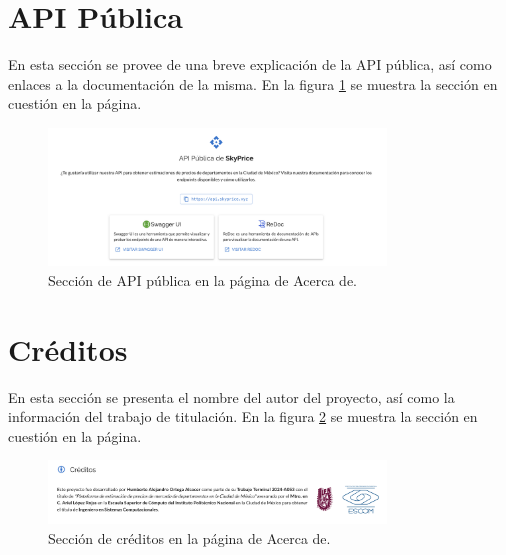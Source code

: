 \section{API Pública}
En esta sección se provee de una breve explicación de la API pública, así como
enlaces a la documentación de la misma. En la figura \ref{fig:api} se muestra la
sección en cuestión en la página.

\begin{figure}[H]
  \centering
  \includegraphics[width=0.8\textwidth]{imagenes/04-acerca-de/api-publica.png}
  \caption{Sección de API pública en la página de Acerca de.}
  \label{fig:api}
\end{figure}

\section{Créditos}
En esta sección se presenta el nombre del autor del proyecto, así como la información
del trabajo de titulación. En la figura \ref{fig:creditos} se muestra la sección en cuestión en la página.

\begin{figure}[H]
  \centering
  \includegraphics[width=0.8\textwidth]{imagenes/04-acerca-de/creditos.png}
  \caption{Sección de créditos en la página de Acerca de.}
  \label{fig:creditos}
\end{figure}
